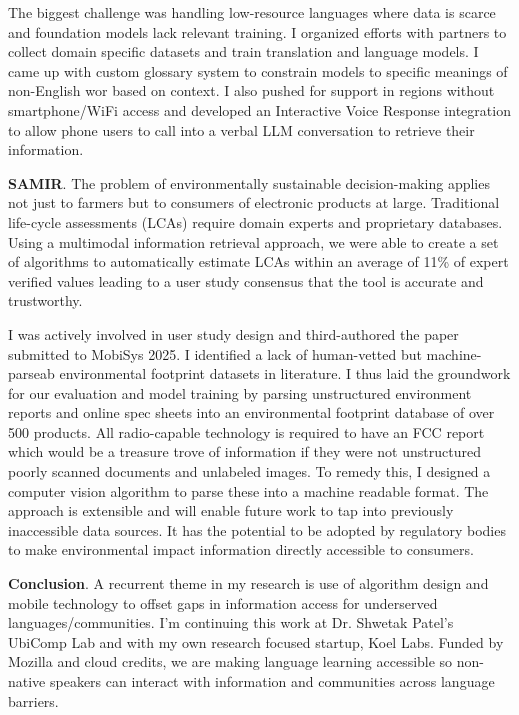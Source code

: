 \documentclass{article}
\begin{document}
The biggest challenge was handling low-resource languages where data is scarce
and foundation models lack relevant training. I organized efforts with partners to collect
domain specific datasets and train translation and language models. I came up with
custom glossary system to constrain models to specific meanings of non-English wor
based on context. I also pushed for support in regions without smartphone/WiFi access
and developed an Interactive Voice Response integration to allow phone users to call into a
verbal LLM conversation to retrieve their information.

\textbf{SAMIR}. The problem of environmentally sustainable decision-making applies not
just to farmers but to consumers of electronic products at large. Traditional life-cycle
assessments (LCAs) require domain experts and proprietary databases. Using a multimodal
information retrieval approach, we were able to create a set of algorithms to automatically
estimate LCAs within an average of 11\% of expert verified values leading to a user study
consensus that the tool is accurate and trustworthy.

I was actively involved in user study design and third-authored the paper submitted
to MobiSys 2025. I identified a lack of human-vetted but machine-parseab
environmental footprint datasets in literature. I thus laid the groundwork for our evaluation
and model training by parsing unstructured environment reports and online spec sheets
into an environmental footprint database of over 500 products. All radio-capable
technology is required to have an FCC report which would be a treasure trove of
information if they were not unstructured poorly scanned documents and unlabeled
images. To remedy this, I designed a computer vision algorithm to parse these into a
machine readable format. The approach is extensible and will enable future work to tap
into previously inaccessible data sources. It has the potential to be adopted by regulatory
bodies to make environmental impact information directly accessible to consumers.

\textbf{Conclusion}. A recurrent theme in my research is use of algorithm design and mobile
technology to offset gaps in information access for underserved languages/communities.
I'm continuing this work at Dr. Shwetak Patel's UbiComp Lab and with my own research
focused startup, Koel Labs. Funded by Mozilla and cloud credits, we are making language
learning accessible so non-native speakers can interact with information and communities
across language barriers.
\end{document}
